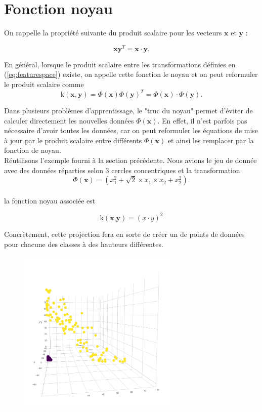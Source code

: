 \section{Fonction noyau}\label{sec:kernel}

On rappelle la propriété suivante du produit scalaire pour les vecteurs $\textbf{x}$ et $\textbf{y}$ : 

$$\textbf{x}\textbf{y}^T = \textbf{x} \cdot \textbf{y}.$$

En général, lorsque le produit scalaire entre les transformations définies en (\ref{eq:featurespace}) existe, on appelle cette fonction le noyau et on peut reformuler le produit scalaire comme
$$\textrm{k}(\textbf{x}, \textbf{y}) = \Phi(\textbf{x})\Phi(\textbf{y})^T = \Phi(\textbf{x})\cdot \Phi(\textbf{y}).$$

Dans plusieurs problèmes d'apprentissage, le "truc du noyau" permet d'éviter de calculer directement les nouvelles données $\Phi(\textbf{x})$. 
En effet, il n'est parfois pas nécessaire d'avoir toutes les données, car on peut reformuler les équations de mise à jour par le produit scalaire 
entre différents $\Phi(\textbf{x})$ et ainsi les remplacer par la fonction de noyau. \\

Réutilisons l'exemple fourni à la section précédente. Nous avions le jeu de donnée avec des données réparties selon 3 cercles concentriques 
et la transformation $$\Phi(\textbf{x})= (x_1^2 + \sqrt{2} \times x_1\times x_2 + x_2^2).$$ \\ la fonction noyau associée est

$$\textrm{k}(\textbf{x,y})= (x \cdot y)^2$$

Concrètement, cette projection fera en sorte de créer un de points de données pour chacune des classes à des hauteurs différentes. 

\begin{figure}[H]
	\centering
	\includegraphics[width=3in]{exemple_1_3d}
\end{figure}


